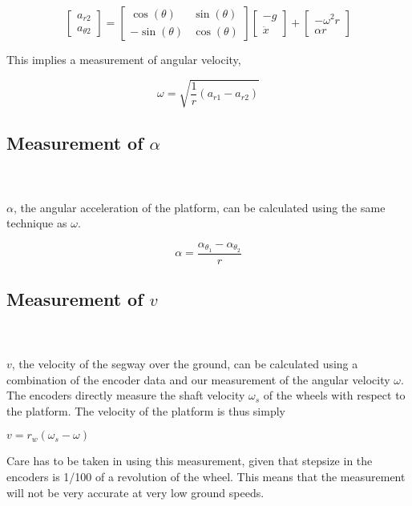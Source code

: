 \documentclass[11pt]{amsart}
\begin{document}
\begin{equation}
\begin{bmatrix}
a_{r2} \\ a_{\theta2}
\end{bmatrix} = \begin{bmatrix}
\cos(\theta) & \sin(\theta) \\ -\sin(\theta) & \cos(\theta)
\end{bmatrix} \begin{bmatrix}
-g \\ \ddot{x}
\end{bmatrix} + \begin{bmatrix}
-\omega^2 r \\ \alpha r
\end{bmatrix}
\end{equation}

This implies a measurement of angular velocity,

\begin{equation}
\omega = \sqrt{\frac{1}{r}(a_{r1}-a_{r2})}
\end{equation}


\subsection{Measurement of $\alpha$}
\ \\ \ \\
$\alpha$, the angular acceleration of the platform, can be calculated using the same technique as $\omega$. 

\begin{equation}
\alpha = \frac{\alpha_{\theta_1}-\alpha_{\theta_2}}{r}
\end{equation}

\subsection{Measurement of $v$}
\ \\ \ \\
$v$, the velocity of the segway over the ground, can be calculated using a combination of the encoder data and our measurement of the angular velocity $\omega$. The encoders directly measure the shaft velocity $\omega_s$ of the wheels with respect to the platform. The velocity of the platform is thus simply

$v = r_w(\omega_s - \omega)$

Care has to be taken in using this measurement, given that stepsize in the encoders is 1/100 of a revolution of the wheel. This means that the measurement will not be very accurate at very low ground speeds.
\end{document}
